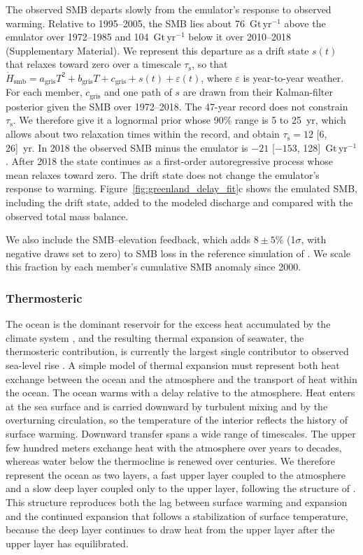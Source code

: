 \documentclass[draft,linenumbers]{agujournal2025}
\begin{document}
The observed SMB departs slowly from the emulator's response to observed warming. Relative to 1995--2005, the \citet{Mouginot2019} SMB lies about 76~Gt\,yr$^{-1}$ above the emulator over 1972--1985 and 104~Gt\,yr$^{-1}$ below it over 2010--2018 (Supplementary Material). We represent this departure as a drift state $s(t)$ that relaxes toward zero over a timescale $\tau_{\mathrm{s}}$, so that $\dot{H}_{\mathrm{smb}} = a_{\mathrm{gris}}T^2 + b_{\mathrm{gris}}T + c_{\mathrm{gris}} + s(t) + \varepsilon(t)$, where $\varepsilon$ is year-to-year weather. For each member, $c_{\mathrm{gris}}$ and one path of $s$ are drawn from their Kalman-filter posterior given the \citet{Mouginot2019} SMB over 1972--2018. The 47-year record does not constrain $\tau_{\mathrm{s}}$. We therefore give it a lognormal prior whose 90\% range is 5 to 25~yr, which allows about two relaxation times within the record, and obtain $\tau_{\mathrm{s}} = 12$ [6, 26]~yr. In 2018 the observed SMB minus the emulator is $-21$ [$-153$, 128]~Gt\,yr$^{-1}$. After 2018 the state continues as a first-order autoregressive process whose mean relaxes toward zero. The drift state does not change the emulator's response to warming. Figure~\ref{fig:greenland_delay_fit}c shows the emulated SMB, including the drift state, added to the modeled discharge and compared with the observed total mass balance.

We also include the SMB--elevation feedback, which adds $8 \pm 5$\% (1$\sigma$, with negative draws set to zero) to SMB loss in the reference simulation of \citet{Fettweis2013}. We scale this fraction by each member's cumulative SMB anomaly since 2000.

\subsubsection{Thermosteric}

The ocean is the dominant reservoir for the excess heat accumulated by the climate system \citep{Cheng2017}, and the resulting thermal expansion of seawater, the thermosteric contribution, is currently the largest single contributor to observed sea-level rise \citep{Frederikse2020}. A simple model of thermal expansion must represent both heat exchange between the ocean and the atmosphere and the transport of heat within the ocean. The ocean warms with a delay relative to the atmosphere. Heat enters at the sea surface and is carried downward by turbulent mixing and by the overturning circulation, so the temperature of the interior reflects the history of surface warming. Downward transfer spans a wide range of timescales. The upper few hundred meters exchange heat with the atmosphere over years to decades, whereas water below the thermocline is renewed over centuries. We therefore represent the ocean as two layers, a fast upper layer coupled to the atmosphere and a slow deep layer coupled only to the upper layer, following the structure of \citet{Geoffroy2013}. This structure reproduces both the lag between surface warming and expansion and the continued expansion that follows a stabilization of surface temperature, because the deep layer continues to draw heat from the upper layer after the upper layer has equilibrated.
\end{document}
